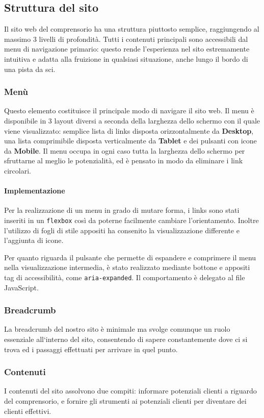 \subsection{Struttura del sito}
Il sito web del comprensorio ha una struttura piuttosto semplice, raggiungendo al massimo 3 livelli di profondità.
Tutti i contenuti principali sono accessibili dal menu di navigazione primario: questo rende l'esperienza nel sito estremamente intuitiva e adatta alla fruizione in qualsiasi situazione, anche lungo il bordo di una pista da sci.

\subsubsection{Menù}
Questo elemento costituisce il principale modo di navigare il sito web. Il menu è disponibile in 3 layout diversi a seconda della larghezza dello schermo con il quale viene visualizzato: semplice lista di links disposta orizzontalmente da \textbf{Desktop}, una lista comprimibile disposta verticalmente da \textbf{Tablet} e dei pulsanti con icone da \textbf{Mobile}.
Il menu occupa in ogni caso tutta la larghezza dello schermo per sfruttarne al meglio le potenzialità, ed è pensato in modo da eliminare i link circolari.
\paragraph{Implementazione}
Per la realizzazione di un menu in grado di mutare forma, i links sono stati inseriti in un \verb|flexbox| così da poterne facilmente cambiare l'orientamento. Inoltre l'utilizzo di fogli di stile appositi ha consenito la visualizzazione differente e l'aggiunta di icone.

Per quanto riguarda il pulsante che permette di espandere e comprimere il menu nella visualizzazione intermedia, è stato realizzato mediante bottone e appositi tag di accessibilità, come \verb|aria-expanded|. Il comportamento è delegato al file JavaScript.
\subsubsection{Breadcrumb}
La breadcrumb del nostro sito è minimale ma svolge comunque un ruolo essenziale all`interno del sito, consentendo di sapere constantemente dove ci si trova ed i passaggi effettuati per arrivare in quel punto.
\subsubsection{Contenuti}
I contenuti del sito assolvono due compiti: informare potenziali clienti a riguardo del comprensorio, e fornire gli strumenti ai potenziali clienti per diventare dei clienti effettivi.

